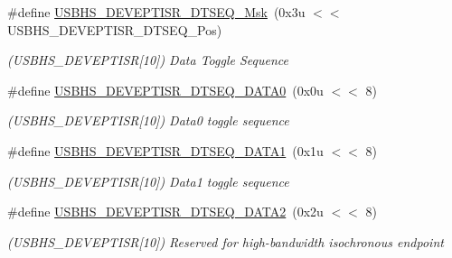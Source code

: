 \begin{DoxyCompactItemize}
\item 
\mbox{\label{group__SAMV71__USBHS_gab87a693003d1be232a36df45a45d35fa}} 
\#define \mbox{\hyperlink{group__SAMV71__USBHS_gab87a693003d1be232a36df45a45d35fa}{U\+S\+B\+H\+S\+\_\+\+D\+E\+V\+E\+P\+T\+I\+S\+R\+\_\+\+D\+T\+S\+E\+Q\+\_\+\+Msk}}~(0x3u $<$$<$ U\+S\+B\+H\+S\+\_\+\+D\+E\+V\+E\+P\+T\+I\+S\+R\+\_\+\+D\+T\+S\+E\+Q\+\_\+\+Pos)
\begin{DoxyCompactList}\small\item\em (U\+S\+B\+H\+S\+\_\+\+D\+E\+V\+E\+P\+T\+I\+SR\mbox{[}10\mbox{]}) Data Toggle Sequence \end{DoxyCompactList}\item 
\mbox{\label{group__SAMV71__USBHS_ga686110b80786155ed941911f7bf7bac0}} 
\#define \mbox{\hyperlink{group__SAMV71__USBHS_ga686110b80786155ed941911f7bf7bac0}{U\+S\+B\+H\+S\+\_\+\+D\+E\+V\+E\+P\+T\+I\+S\+R\+\_\+\+D\+T\+S\+E\+Q\+\_\+\+D\+A\+T\+A0}}~(0x0u $<$$<$ 8)
\begin{DoxyCompactList}\small\item\em (U\+S\+B\+H\+S\+\_\+\+D\+E\+V\+E\+P\+T\+I\+SR\mbox{[}10\mbox{]}) Data0 toggle sequence \end{DoxyCompactList}\item 
\mbox{\label{group__SAMV71__USBHS_ga80408964fc89b049ba2ba0d502597d9d}} 
\#define \mbox{\hyperlink{group__SAMV71__USBHS_ga80408964fc89b049ba2ba0d502597d9d}{U\+S\+B\+H\+S\+\_\+\+D\+E\+V\+E\+P\+T\+I\+S\+R\+\_\+\+D\+T\+S\+E\+Q\+\_\+\+D\+A\+T\+A1}}~(0x1u $<$$<$ 8)
\begin{DoxyCompactList}\small\item\em (U\+S\+B\+H\+S\+\_\+\+D\+E\+V\+E\+P\+T\+I\+SR\mbox{[}10\mbox{]}) Data1 toggle sequence \end{DoxyCompactList}\item 
\mbox{\label{group__SAMV71__USBHS_gad21f23dbbe4b746cb9b0bbf10ee091f0}} 
\#define \mbox{\hyperlink{group__SAMV71__USBHS_gad21f23dbbe4b746cb9b0bbf10ee091f0}{U\+S\+B\+H\+S\+\_\+\+D\+E\+V\+E\+P\+T\+I\+S\+R\+\_\+\+D\+T\+S\+E\+Q\+\_\+\+D\+A\+T\+A2}}~(0x2u $<$$<$ 8)
\begin{DoxyCompactList}\small\item\em (U\+S\+B\+H\+S\+\_\+\+D\+E\+V\+E\+P\+T\+I\+SR\mbox{[}10\mbox{]}) Reserved for high-\/bandwidth isochronous endpoint \end{DoxyCompactList}\item 

\end{DoxyCompactItemize}
